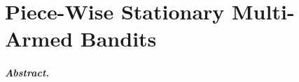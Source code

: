 

\chapter{Piece-Wise Stationary Multi-Armed Bandits}
\label{chapter:6}

\graphicspath{{2-Chapters/6-Chapter/Images/}}

\paragraph{Abstract.}

